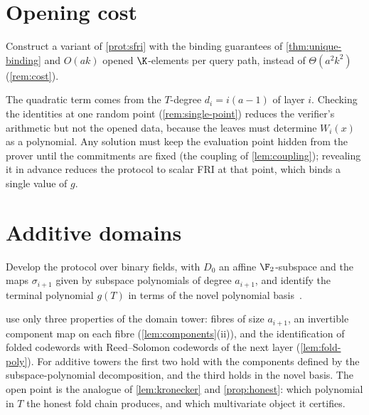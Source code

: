 \section{Opening cost}

\begin{problem}\label{prob:cost}
Construct a variant of \cref{prot:sfri} with the binding guarantees of
\cref{thm:unique-binding} and $O(ak)$ opened $\K$-elements per query path, instead of
$\Theta(a^2k^2)$ (\cref{rem:cost}).
\end{problem}

The quadratic term comes from the $T$-degree $d_i=i(a-1)$ of layer $i$. Checking the
identities at one random point (\cref{rem:single-point}) reduces the verifier's
arithmetic but not the opened data, because the leaves must determine $W_i(x)$ as a
polynomial. Any solution must keep the evaluation point hidden from the prover until the
commitments are fixed (the coupling of \cref{lem:coupling}); revealing it in advance
reduces the protocol to scalar FRI at that point, which binds a single value of $g$.

\section{Additive domains}

\begin{problem}\label{prob:additive}
Develop the protocol over binary fields, with $D_0$ an affine $\F_2$-subspace and the
maps $\sigma_{i+1}$ given by subspace polynomials of degree $a_{i+1}$, and identify the
terminal polynomial $g(T)$ in terms of the novel polynomial basis~\cite{LCH14,DP24}.
\end{problem}

 use only three properties of the domain tower: fibres of size
$a_{i+1}$, an invertible component map on each fibre (\cref{lem:components}(ii)), and the
identification of folded codewords with Reed--Solomon codewords of the next layer
(\cref{lem:fold-poly}). For additive towers the first two hold with the components
defined by the subspace-polynomial decomposition, and the third holds in the novel
basis. The open point is the analogue of \cref{lem:kronecker} and \cref{prop:honest}: which
polynomial in $T$ the honest fold chain produces, and which multivariate object it
certifies.
